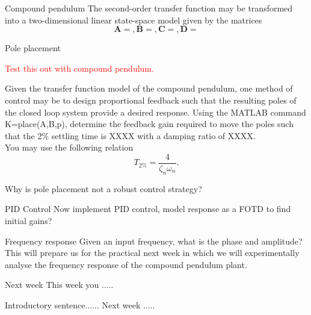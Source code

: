 \documentclass[9pt]{beamer-control}
\begin{document}
\begin{frame}{Compound pendulum}
The second-order transfer function may be transformed into a two-dimensional linear state-space model given by the matrices
\[\mathbf{A} = , \mathbf{B} = , \mathbf{C} = , \mathbf{D}=  \]
\end{frame}



\begin{frame}{Pole placement}

\textcolor{red}{Test this out with compound pendulum.}

Given the transfer function model of the compound pendulum, one method of control may be to design proportional feedback such that the resulting poles of the closed loop system provide a desired response. Using the MATLAB command K=place(A,B,p), determine the feedback gain required to move the poles such that the 2\% settling time is XXXX with a damping ratio of XXXX. \\
You may use the following relation
\[ T_{2\%} = \frac{4}{\zeta_n \omega_n}. \]

Why is pole placement not a robust control strategy?


\end{frame}


\begin{frame}{PID Control}
Now implement PID control, model response as a FOTD to find initial gains?
\end{frame}



\begin{frame}{Frequency response}
Given an input frequency, what is the phase and amplitude? \\

This will prepare us for the practical next week in which we will experimentally analyse the frequency response of the compound pendulum plant.
\end{frame}



\begin{frame}{Next week}
	This week you .....
	
	Introductory sentence...... Next week ..... 
\end{frame}
\end{document}
